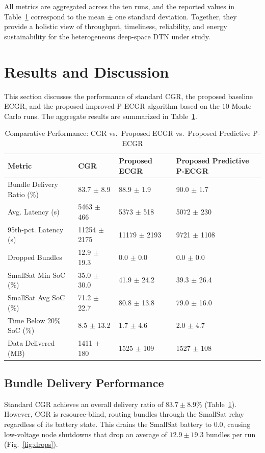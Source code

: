 \documentclass[a4paper,fleqn]{cas-dc}
\newcommand{\ecgr}{\textsf{ECGR}}
\newcommand{\cgr}{\textsf{CGR}}
\newcommand{\pecgr}{\textsf{P-ECGR}}
\begin{document}
All metrics are aggregated across the ten runs, and the reported values in Table~\ref{tab:results} correspond to the mean $\pm$ one standard deviation. Together, they provide a holistic view of throughput, timeliness, reliability, and energy sustainability for the heterogeneous deep-space DTN under study.

\section{Results and Discussion}
\label{sec:results}

This section discusses the performance of standard \cgr{}, the proposed baseline \ecgr{}, and the proposed improved \pecgr{} algorithm based on the $10$ Monte Carlo runs. The aggregate results are summarized in Table~\ref{tab:results}.

\begin{table}[t]
\centering
\caption{Comparative Performance: CGR vs.\ Proposed ECGR vs.\ Proposed Predictive P-ECGR}
\label{tab:results}
\begin{tabular*}{\textwidth}{@{\extracolsep{\fill}}llll}
\hline
\textbf{Metric} & \textbf{CGR} & \textbf{Proposed ECGR} & \textbf{Proposed Predictive P-ECGR} \\
\hline
Bundle Delivery Ratio (\%) & 83.7 $\pm$ 8.9 & 88.9 $\pm$ 1.9 & 90.0 $\pm$ 1.7 \\
Avg. Latency (s) & 5463 $\pm$ 466 & 5373 $\pm$ 518 & 5072 $\pm$ 230 \\
95th-pct. Latency (s) & 11254 $\pm$ 2175 & 11179 $\pm$ 2193 & 9721 $\pm$ 1108 \\
Dropped Bundles & 12.9 $\pm$ 19.3 & 0.0 $\pm$ 0.0 & 0.0 $\pm$ 0.0 \\
SmallSat Min SoC (\%) & 35.0 $\pm$ 30.0 & 41.9 $\pm$ 24.2 & 39.3 $\pm$ 26.4 \\
SmallSat Avg SoC (\%) & 71.2 $\pm$ 22.7 & 80.8 $\pm$ 13.8 & 79.0 $\pm$ 16.0 \\
Time Below 20\% SoC (\%) & 8.5 $\pm$ 13.2 & 1.7 $\pm$ 4.6 & 2.0 $\pm$ 4.7 \\
Data Delivered (MB) & 1411 $\pm$ 180 & 1525 $\pm$ 109 & 1527 $\pm$ 108 \\
\hline
\end{tabular*}
\end{table}

\subsection{Bundle Delivery Performance}
Standard \cgr{} achieves an overall delivery ratio of $83.7 \pm 8.9\%$ (Table~\ref{tab:results}). However, \cgr{} is resource-blind, routing bundles through the SmallSat relay regardless of its battery state. This drains the SmallSat battery to $0.0$, causing low-voltage node shutdowns that drop an average of $12.9 \pm 19.3$ bundles per run (Fig.~\ref{fig:drops}). 
\end{document}
